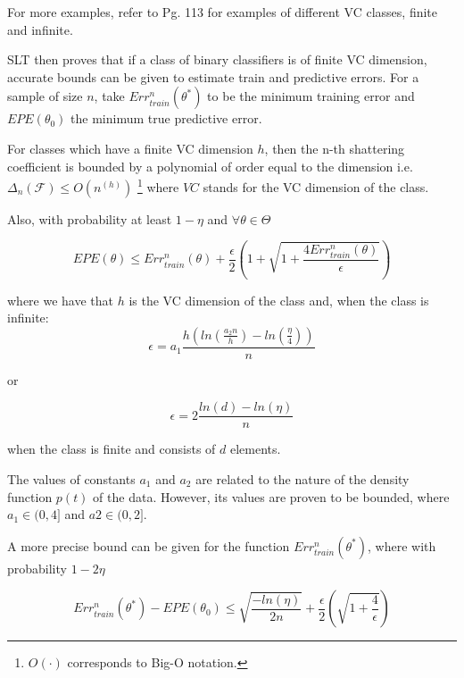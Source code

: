 For more examples, refer to \cite{cherkassky-learning2007} Pg. 113 for examples of different VC classes, finite and infinite.

SLT then proves that if a class of binary classifiers is of finite VC dimension, accurate bounds can be given to estimate train and predictive errors. For a sample of size $n$, take $Err^n_{train}(\theta^*)$ to be the minimum training error and $EPE(\theta_0)$ the minimum true predictive error. 

For classes which have a finite VC dimension $h$, then the n-th shattering coefficient is bounded by a polynomial of order equal to the dimension 
i.e. $\Delta_n(\mathcal {F}) \leq O(n^(h))$ \footnote{$O(\cdot)$ corresponds to Big-O notation.} where $VC$ stands for the VC dimension of the class.

Also, with probability at least $1 - \eta$ and $\forall \theta \in \Theta$

\begin{equation}\label{vapnik-classificationBound}
EPE(\theta) \leq  Err^n_{train}(\theta) + \frac{\epsilon}{2} \left(1 + \sqrt{1 + \frac{4 Err^n_{train}(\theta)  }{\epsilon}}  \right)    
\end{equation}

where we have that $h$ is the VC dimension of the class and, when the class is infinite: 
\begin{equation}\label{vapnik-epsilonBound}
\epsilon = a_1 \frac{h \left( ln(\frac{a_2 n}{h} ) -  ln(\frac{\eta}{4} ) \right)}{n}
\end{equation}

or 

\begin{equation}\label{vapnik-epsilonBound}
\epsilon = 2 \frac{ ln(d) - ln(\eta)}{n}
\end{equation}

when the class is finite and consists of $d$ elements.

The values of constants $a_1$ and $a_2$ are related to the nature of the density function $p(t)$ of the data. However, its values are proven to be bounded, where $a_1 \in (0,4 ]$ and $a2 \in (0,2 ]$. 


A more precise bound can be given for the function $Err^n_{train}(\theta^*)$, where with probability $1 - 2\eta$ 

\begin{equation}\label{vapnik-classificationBoundPrecise}
Err^n_{train}(\theta^*) - EPE(\theta_0) \leq  \sqrt{\frac{-ln(\eta)}{2n} } + \frac{\epsilon}{2}\left( \sqrt{1 + \frac{4}{\epsilon} } \right)
\end{equation}

